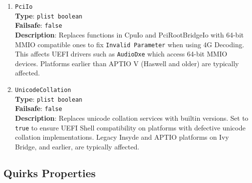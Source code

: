 \documentclass[]{article}
\makeatletter
\renewcommand{\label}[1]{%
\zref@wrapper@immediate{\oldlabel{#1}}}  %
\makeatother
\begin{document}
\begin{enumerate}
\item
  \texttt{PciIo}\\
  \textbf{Type}: \texttt{plist\ boolean}\\
  \textbf{Failsafe}: \texttt{false}\\
  \textbf{Description}: Replaces functions in CpuIo and PciRootBridgeIo with
  64-bit MMIO compatible ones to fix \texttt{Invalid Parameter} when using 4G Decoding.
  This affects UEFI drivers such as \texttt{AudioDxe} which access 64-bit MMIO devices.
  Platforms earlier than APTIO V (Haswell and older) are typically affected.

\item
  \texttt{UnicodeCollation}\\
  \textbf{Type}: \texttt{plist\ boolean}\\
  \textbf{Failsafe}: \texttt{false}\\
  \textbf{Description}: Replaces unicode collation services with builtin
  versions. Set to \texttt{true} to ensure UEFI Shell compatibility on platforms
  with defective unicode collation implementations. Legacy Insyde and APTIO platforms
  on Ivy Bridge, and earlier, are typically affected.

\end{enumerate}

\subsection{Quirks Properties}\label{uefiquirkprops}
\end{document}
